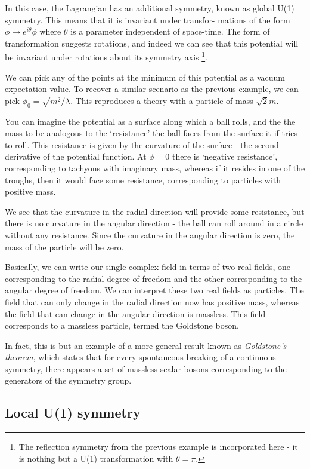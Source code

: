 In this case, the Lagrangian has an additional symmetry, known as
global U(1) symmetry. This means that it is invariant under transfor- mations of the form $\phi\rightarrow e^{i\theta}\phi$ where $\theta$ is a parameter independent of space-time. The form of transformation suggests rotations, and indeed we can see that this potential will be invariant under rotations about its symmetry axis \footnote{ The reflection symmetry from the previous example is incorporated here - it is nothing but a U(1) transformation with $\theta = \pi$.}.

We can pick any of the points at the minimum of this potential as a vacuum expectation value. To recover a similar scenario as the previous example, we can pick $\phi_0 = \sqrt{m^2/\lambda}$. This reproduces a theory with a particle of mass $\sqrt{2}m$.

You can imagine the potential as a surface along which a ball rolls, and the the mass to be analogous to the `resistance' the ball faces from the surface it if tries to roll. This resistance is given by the curvature of the surface - the second derivative of the potential function.
At $\phi = 0$ there is `negative resistance', corresponding to tachyons with imaginary mass, whereas if it resides in one of the troughs, then it would face some resistance, corresponding to particles with positive mass.

We see that the curvature in the radial direction will provide some resistance, but there is no curvature in the angular direction - the ball can roll around in a circle without any resistance. Since the curvature in the angular direction is zero, the mass of the particle will be zero.

Basically, we can write our single complex field in terms of two real fields, one corresponding to the radial degree of freedom and the other corresponding to the angular degree of freedom. We can interpret these two real fields as particles. The field that can only change in the radial direction now has positive mass, whereas the field that can change in the angular direction is massless. This field corresponds to a massless particle, termed the Goldstone boson.

In fact, this is but an example of a more general result known as \emph{Goldstone's theorem}, which states that for every spontaneous breaking of a continuous symmetry, there appears a set of massless scalar bosons corresponding to the generators of the symmetry group.

\subsection{Local U(1) symmetry}

